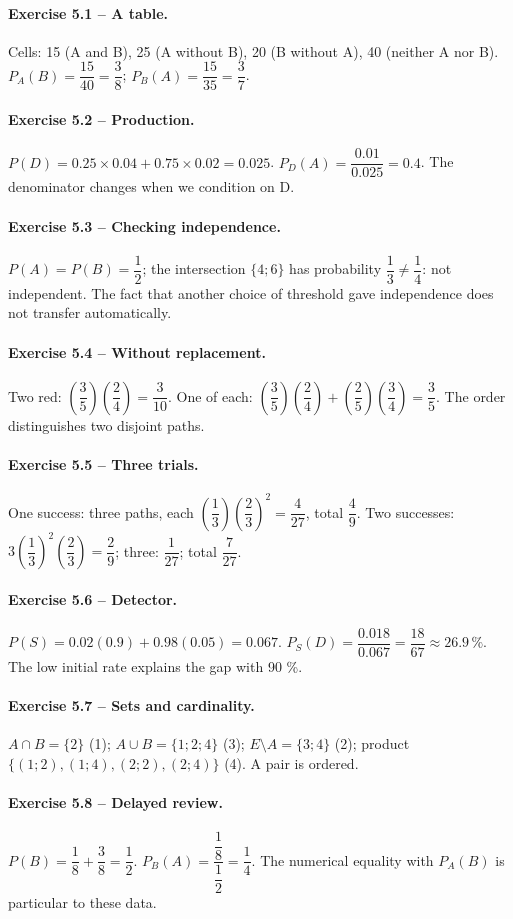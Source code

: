 \paragraph{Exercise 5.1 -- A table.} Cells: 15 (A and B), 25 (A without B), 20 (B without A), 40 (neither A nor B). $P_A(B)=\dfrac{15}{40}=\dfrac{3}{8}$; $P_B(A)=\dfrac{15}{35}=\dfrac{3}{7}$.
\paragraph{Exercise 5.2 -- Production.} $P(D)=0.25\times0.04+0.75\times0.02=0.025$. $P_D(A)=\dfrac{0.01}{0.025}=0.4$. The denominator changes when we condition on D.
\paragraph{Exercise 5.3 -- Checking independence.} $P(A)=P(B)=\dfrac{1}{2}$; the intersection $\{4;6\}$ has probability $\dfrac{1}{3}\ne \dfrac{1}{4}$: not independent. The fact that another choice of threshold gave independence does not transfer automatically.
\paragraph{Exercise 5.4 -- Without replacement.} Two red: $(\dfrac{3}{5})(\dfrac{2}{4})=\dfrac{3}{10}$. One of each: $(\dfrac{3}{5})(\dfrac{2}{4})+(\dfrac{2}{5})(\dfrac{3}{4})=\dfrac{3}{5}$. The order distinguishes two disjoint paths.
\paragraph{Exercise 5.5 -- Three trials.} One success: three paths, each $(\dfrac{1}{3})(\dfrac{2}{3})^2=\dfrac{4}{27}$, total $\dfrac{4}{9}$. Two successes: $3(\dfrac{1}{3})^2(\dfrac{2}{3})=\dfrac{2}{9}$; three: $\dfrac{1}{27}$; total $\dfrac{7}{27}$.
\paragraph{Exercise 5.6 -- Detector.} $P(S)=0.02(0.9)+0.98(0.05)=0.067$. $P_S(D)=\dfrac{0.018}{0.067}=\dfrac{18}{67}\approx 26.9\,\%$. The low initial rate explains the gap with 90 \%.
\paragraph{Exercise 5.7 -- Sets and cardinality.} $A\cap B=\{2\}$ (1); $A\cup B=\{1;2;4\}$ (3); $E\setminus A=\{3;4\}$ (2); product $\{(1;2),(1;4),(2;2),(2;4)\}$ (4). A pair is ordered.
\paragraph{Exercise 5.8 -- Delayed review.} $P(B)=\dfrac{1}{8}+\dfrac{3}{8}=\dfrac{1}{2}$. $P_B(A)=\dfrac{\dfrac{1}{8}}{\dfrac{1}{2}}=\dfrac{1}{4}$. The numerical equality with $P_A(B)$ is particular to these data.
